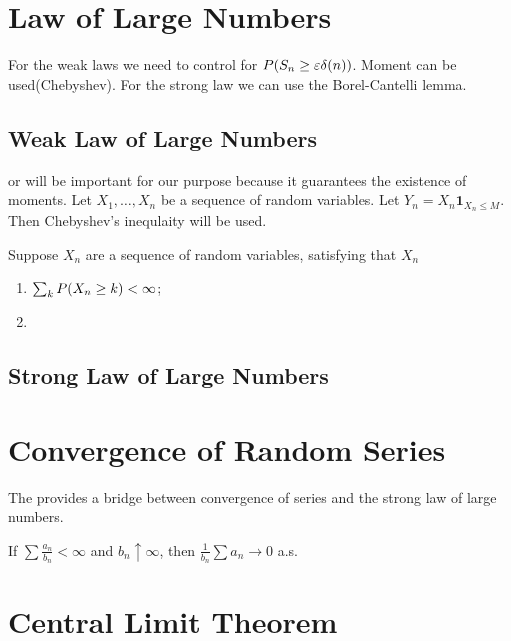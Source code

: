 \section{Law of Large Numbers}

For the weak laws we need to control for \(P\pqty{S_{n} \geq \epsilon \delta(n)}\). Moment can be used(Chebyshev). For the strong law we can use the Borel-Cantelli lemma. 

\subsection{Weak Law of Large Numbers}

 or  will be important for our purpose because it guarantees the existence of moments. Let \(X_{1},\dots, X_{n}\) be a sequence of random variables. Let \(Y_{n} = X_{n}\mathbf{1}_{X_{n} \leq M}\). Then Chebyshev's inequlaity will be used.

\begin{thm}
    Suppose \(X_{n}\) are a sequence of random variables, satisfying that \(X_{n}\)
    \begin{enumerate}
        \item \(\sum_{k} P \pqty{X_{n} \geq k} < \infty\);
        \item 
    \end{enumerate}
\end{thm}

\subsection{Strong Law of Large Numbers}

\section{Convergence of Random Series}

The  provides a bridge between convergence of series and the strong law of large numbers. 
\begin{lemma}
    If \(\sum \frac{a_{n}}{b_{n}} < \infty\) and \(b_{n} \uparrow \infty\), then \(\frac{1}{b_{n}} \sum a_{n} \to 0\) a.s.
\end{lemma}




\section{Central Limit Theorem}